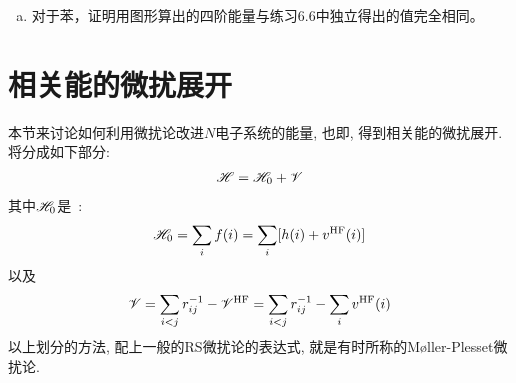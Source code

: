 {\begin{enumerate}[a.]
\begin{equation*}
\begin{tikzpicture}[baseline={(current bounding box.center)}, postaction={on each segment={mid arrow}},scale=.6]
			arc (-45:15:2.12cm)node[right,midway]{r} node{\dian} arc(-15:-45:2.12cm)node[left,midway]{b} node{\dian} arc(225:180:2.57cm)node[right,midway]{s} node{\dian} to [bend right] node[left,midway]{s} (8,-7.);
		\end{tikzpicture}
		=
		\begin{tikzpicture}[baseline={(current bounding box.center)}, postaction={on each segment={mid arrow}},scale=.6]
		\path [draw=blue,postaction={on each segment={mid reverse arrow}}]
		(10,-7.) node{\dian}
		arc (-45:15:2.12cm)node[right,midway]{r} node{\dian} arc(-15:-45:2.12cm)node[left,midway]{b} node{\dian} arc(225:180:2.57cm)node[right,midway]{s} node{\dian} to [bend right] node[left,midway]{s} (10,-7.);
		\draw (12,-5.5)node{$n=4$};
		\end{tikzpicture}
		=-\frac{3N\beta}{128}
		\end{equation*}
		继而有
		\begin{equation*}
		E_0^{(4)} = \frac{N\beta}{64}
		\end{equation*}
		因此环多烯（$N>6$）的共振能算到第四阶就是$(1/4+1/64)N\beta=0.2656 N\beta$, 和渐近的精确值$0.2732\beta$相比非常接近（占97\%）。
	\item 对于苯，证明用图形算出的四阶能量与练习6.6中独立得出的值完全相同。
\end{enumerate}
}


\section{相关能的微扰展开}
本节来讨论如何利用微扰论改进$N$电子系统的\hft 能量, 
也即, 
得到相关能的微扰展开. 
将\ha 分成如下部分:
\begin{align}
\mathscr{H}=\mathscr{H}_0+\mathscr{V}
\end{align} 
其中$\mathscr{H}_0$是\hft\ \ha:
\begin{align}
\mathscr{H}_0=\sum_{i} f(i) = \sum_{i}[h(i)+v^\mathrm{HF}(i)]
\end{align}
以及
\begin{align}
\mathscr{V} = \sum_{i<j}r_{ij}^{-1} - \mathscr{V}^\mathrm{HF} =  \sum_{i<j}r_{ij}^{-1} - \sum_{i}v^\mathrm{HF}(i)
\end{align}
以上划分\ha 的方法, 
配上一般的RS微扰论的表达式, 
就是有时所称的{M{\o}ller-Plesset}微扰论.


